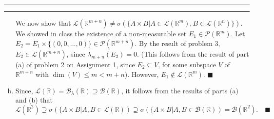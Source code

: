\documentclass[11pt]{article}
\newcounter{questionCounter}
\newcounter{partCounter}[questionCounter]
\newenvironment{question}[2][\arabic{questionCounter}]{%
    \setcounter{partCounter}{0}%
    \vspace{.25in} \hrule \vspace{0.5em}%
        \noindent{\bf #2}%
    \vspace{0.8em} \hrule \vspace{.10in}%
    \addtocounter{questionCounter}{1}%
}{}
\renewcommand{\qed}{\quad $\blacksquare$}
\newcommand{\mqed}{\quad \blacksquare}
\newcommand{\R}{\mathbb{R}} %
\newcommand{\pow}[1]{\mathcal{P}\left(#1\right)} %
\newcommand{\LR}[1]{\mathcal{L}\left(\R^{#1}\right)} %
\newcommand{\B}{\mathcal{B}} %
\begin{document}
\begin{question}{Problem 4}
\begin{enumerate}[(a)]
We now show that
$\LR{m + n} \neq \sigma(\{A \times B | A \in \LR{m}, B \in \LR{n}\})$. We
showed in class the existence of a non-measurable set $E_1 \in \pow{\R^m}$.
Let $E_2 = E_1 \times \{(0,0,\ldots,0)\} \in \pow{\R^{m + n}}$. By the result
of problem 3, $E_2 \in \LR{m + n}$, since $\lambda_{m + n}(E_2) = 0$. (This
follows from the result of part (a) of problem 2 on Assignment 1, since
$E_2 \subseteq V$, for some subspace $V$ of $\R^{m + n}$ with
$\dim(V) \leq m < m + n$). However, $E_1 \not \in \LR{m}$. \qed

\item Since, $\mathcal{L}(\R) = \B_{\lambda}(\R) \supseteq \B(\R)$, it follows
from the results of parts (a) and (b) that
\[\mathcal{L}(\R^2)
 \supsetneq \sigma\left( \{A \times B | A,B \in \mathcal{L}(\R) \right)
 \supseteq  \sigma\left( \{A \times B | A,B \in \B(\R) \right)
 = \B(\R^2). \mqed
\]
\end{enumerate}
\end{question}
\end{document}
